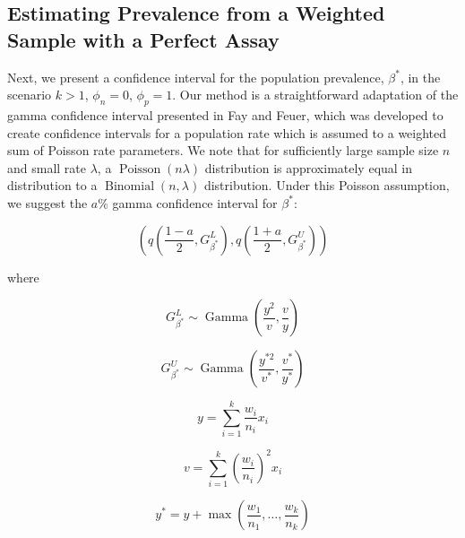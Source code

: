 \documentclass[AMA,STIX1COL]{WileyNJD-v2}
\begin{document}
\subsection{Estimating Prevalence from a Weighted Sample with a Perfect Assay}
\label{sec:weight-perfect}
Next, we present a confidence interval for the population prevalence, \( \beta^* \), in the scenario \( k > 1 \), \( \phi_n = 0 \), \( \phi_p = 1 \).
Our method is a straightforward adaptation of the gamma confidence interval presented in Fay and Feuer\cite{FayF:1997}, which was developed to create confidence intervals for a population rate which is assumed to a weighted sum of Poisson rate parameters.
We note that for sufficiently large sample size \( n \) and small rate \( \lambda \), a \( \operatorname{Poisson}(n\lambda) \) distribution is approximately equal in distribution to a \( \operatorname{Binomial}(n, \lambda) \) distribution.
Under this Poisson assumption, we suggest the \( a \)\% gamma confidence interval for \( \beta^* \):

\begin{equation}
    \left( q\left( \frac{1 - a}{2}, G_{\beta^*}^L \right), q \left( \frac{1 + a}{2},  G_{\beta^*}^U \right) \right)
\end{equation}


where

\begin{equation*}
    G_{\beta^*}^L \sim \operatorname{Gamma}\left( \frac{y^2}{v}, \frac{v}{y} \right)
\end{equation*}

\begin{equation*}
    G_{\beta^*}^U \sim \operatorname{Gamma}\left( \frac{y^{*2}}{v^*}, \frac{v^*}{y^*} \right)
\end{equation*}

\begin{equation*}
    y = \sum_{i=1}^k \frac{w_i}{n_i} x_i
\end{equation*}

\begin{equation*}
    v = \sum_{i=1}^k \left( \frac{w_i}{n_i}\right)^2 x_i
\end{equation*}

\begin{equation*}
    y^* = y + \max\left(\frac{w_1}{n_1}, \ldots, \frac{w_k}{n_k} \right)
\end{equation*}
\end{document}
